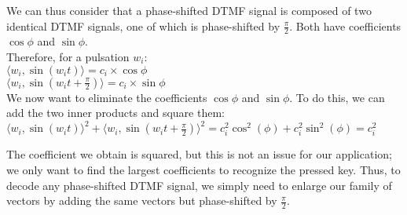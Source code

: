 We can thus consider that a phase-shifted DTMF signal is composed of two identical DTMF signals, one of which is phase-shifted by \( \frac{\pi}{2} \). Both have coefficients \( \cos{\phi} \) and \( \sin{\phi} \).\\

Therefore, for a pulsation \( w_i \):
\\
\( \langle w_i, \sin(w_i t) \rangle = {c_i} \times \cos{\phi} \)\\
\( \langle w_i, \sin(w_i t + \frac{\pi}{2}) \rangle = {c_i} \times \sin{\phi} \)\\

We now want to eliminate the coefficients \( \cos{\phi} \) and \( \sin{\phi} \). To do this, we can add the two inner products and square them:
\\
\( \langle w_i, \sin(w_i t) \rangle^2 + \langle w_i, \sin(w_i t + \frac{\pi}{2}) \rangle^2 = c_i^2 \cos^2(\phi) + c_i^2 \sin^2(\phi) = c_i^2 \)

The coefficient we obtain is squared, but this is not an issue for our application; we only want to find the largest coefficients to recognize the pressed key.
Thus, to decode any phase-shifted DTMF signal, we simply need to enlarge our family of vectors by adding the same vectors but phase-shifted by \( \frac{\pi}{2} \).
